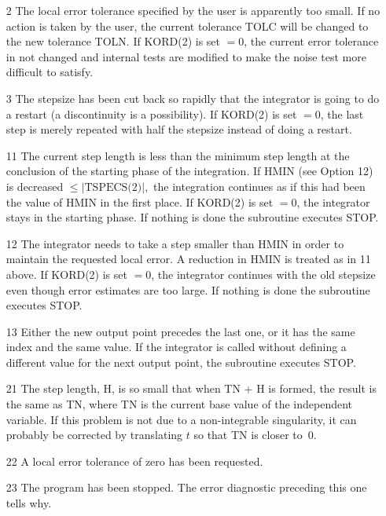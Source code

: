 \documentclass[twoside]{MATH77}
\begin{document}
\begin{itemize}
\item[2]  The local error tolerance specified by the user is apparently too
small. If no action is taken by the user, the current tolerance TOLC will be
changed to the new tolerance TOLN. If KORD(2) is set $=0$, the current error
tolerance in not changed and internal tests are modified to make the noise
test more difficult to satisfy.

\item[3]  The stepsize has been cut back so rapidly that the integrator is
going to do a restart (a discontinuity is a possibility). If KORD(2) is set $%
=0$, the last step is merely repeated with half the stepsize instead of
doing a restart.

\item[11]  The current step length is less than the minimum step length at
the conclusion of the starting phase of the integration. If HMIN (see Option
12) is decreased $\leq |\text{TSPECS(2)}|,$ the integration continues as if
this had been the value of HMIN in the first place. If KORD(2) is set $=0$,
the integrator stays in the starting phase. If nothing is done the
subroutine executes STOP.

\item[12]  The integrator needs to take a step smaller than HMIN in order to
maintain the requested local error. A reduction in HMIN is treated as in
11 above.  If KORD(2) is set $=0$, the integrator continues with the old
stepsize even though error estimates are too large. If nothing is done the
subroutine executes STOP.

\item[13]  Either the new output point precedes the last one, or it has the
same index and the same value. If the integrator is called without defining
a different value for the next output point, the subroutine executes STOP.

\item[21]  The step length, H, is so small that when TN + H is formed, the
result is the same as TN, where TN is the current base value of the
independent variable. If this problem is not due to a non-integrable
singularity, it can probably be corrected by translating $t$ so that TN is
closer to~0.

\item[22]  A local error tolerance of zero has been requested.

\item[23]  The program has been stopped. The error diagnostic preceding this
one tells why.


\end{itemize}
\end{document}

